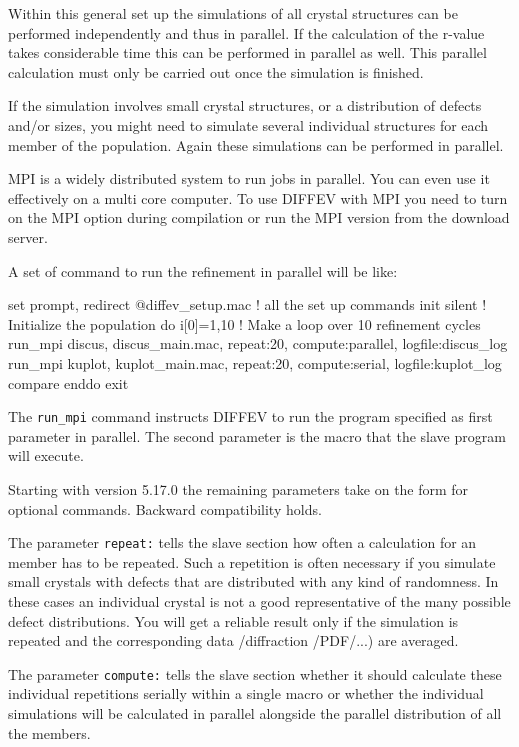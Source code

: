 Within this general set up the simulations of all crystal structures can be 
performed independently and thus in parallel. If the calculation of the 
r-value takes considerable time this can be performed in parallel as well. 
This parallel calculation must only be carried out once the simulation
is finished.

If the simulation involves small crystal structures, or a distribution of
defects and/or sizes, you might need to simulate several individual 
structures for each member of the population. Again these simulations can be
performed in parallel.

MPI is a widely distributed system to run jobs in parallel. You can even 
use it effectively on a multi core computer. To use DIFFEV with MPI you need 
to turn on the MPI option during compilation or run the MPI version from
the \Discus download server.

A set of command to run the refinement in parallel will be like:

\begin{MacVerbatim}
   set prompt, redirect
   @diffev_setup.mac       ! all the set up commands 
   init silent             ! Initialize the population
   do i[0]=1,10            ! Make a loop over 10 refinement cycles
      run_mpi discus, discus_main.mac, repeat:20, compute:parallel, logfile:discus_log
      run_mpi kuplot, kuplot_main.mac, repeat:20, compute:serial,   logfile:kuplot_log
      compare
   enddo
   exit
\end{MacVerbatim}
 
The {\tt run\_mpi} command instructs DIFFEV to run the program specified as
first parameter in parallel. The second parameter is the macro that the slave 
program will execute. 

Starting with version 5.17.0 the remaining parameters take on the form for
optional commands. Backward compatibility holds.

The parameter {\tt repeat:} tells the slave section how often a calculation for 
an member has to be repeated. Such a repetition is often necessary if you simulate
small crystals with defects that are distributed with any kind of randomness. In
these cases an individual crystal is not a good representative of the many 
possible defect distributions. You will get a reliable result only if the simulation
is repeated and the corresponding data /diffraction /PDF/...) are averaged.

The parameter {\tt compute:} tells the slave section whether it should calculate
these individual repetitions serially within a single macro or whether the 
individual simulations will be calculated in parallel alongside the parallel
distribution of all the members.

